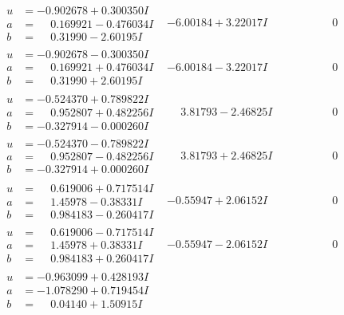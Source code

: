 \documentclass[1p]{elsarticle_modified}
\theoremstyle{definition}
\begin{document}
$$\begin{array}{c|c|c}
\begin{aligned}
u &= -0.902678 + 0.300350 I \\
a &= \phantom{-}0.169921 - 0.476034 I \\
b &= \phantom{-}0.31990 - 2.60195 I\end{aligned}
 & -6.00184 + 3.22017 I & \phantom{-0.000000 } 0 \\ \hline\begin{aligned}
u &= -0.902678 - 0.300350 I \\
a &= \phantom{-}0.169921 + 0.476034 I \\
b &= \phantom{-}0.31990 + 2.60195 I\end{aligned}
 & -6.00184 - 3.22017 I & \phantom{-0.000000 } 0 \\ \hline\begin{aligned}
u &= -0.524370 + 0.789822 I \\
a &= \phantom{-}0.952807 + 0.482256 I \\
b &= -0.327914 - 0.000260 I\end{aligned}
 & \phantom{-}3.81793 - 2.46825 I & \phantom{-0.000000 } 0 \\ \hline\begin{aligned}
u &= -0.524370 - 0.789822 I \\
a &= \phantom{-}0.952807 - 0.482256 I \\
b &= -0.327914 + 0.000260 I\end{aligned}
 & \phantom{-}3.81793 + 2.46825 I & \phantom{-0.000000 } 0 \\ \hline\begin{aligned}
u &= \phantom{-}0.619006 + 0.717514 I \\
a &= \phantom{-}1.45978 - 0.38331 I \\
b &= \phantom{-}0.984183 - 0.260417 I\end{aligned}
 & -0.55947 + 2.06152 I & \phantom{-0.000000 } 0 \\ \hline\begin{aligned}
u &= \phantom{-}0.619006 - 0.717514 I \\
a &= \phantom{-}1.45978 + 0.38331 I \\
b &= \phantom{-}0.984183 + 0.260417 I\end{aligned}
 & -0.55947 - 2.06152 I & \phantom{-0.000000 } 0 \\ \hline\begin{aligned}
u &= -0.963099 + 0.428193 I \\
a &= -1.078290 + 0.719454 I \\
b &= \phantom{-}0.04140 + 1.50915 I\end{aligned}

\end{array}$$
\end{document}
